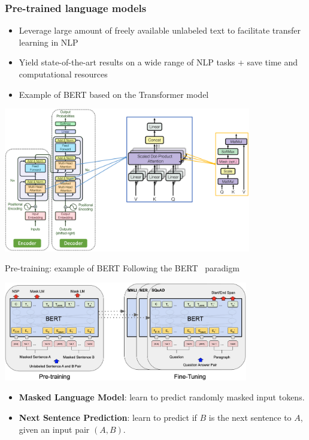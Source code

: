 \documentclass[table]{beamer}
\begin{document}
\begin{frame}
\frametitle{Pre-trained language models}
	\begin{itemize}
		\item Leverage large amount of freely available unlabeled text to facilitate transfer learning in NLP
		\item Yield state-of-the-art results on a wide range of NLP tasks + save time and computational resources
		\item Example of BERT \citep{bert} based on the Transformer model \citep{Vaswani2017}
	\end{itemize}
	
	\begin{center}
	\includegraphics[width=0.81\textwidth]{transformer_all}
	\end{center}


\end{frame}


\begin{frame}{Pre-training: example of BERT}{}	
Following the BERT~\cite{bert} paradigm
\begin{center}
	\includegraphics[width=0.8\textwidth]{bert_finetune}
\end{center}
	\begin{itemize}
		\item \textbf{Masked Language Model}: learn to predict randomly masked input tokens.
		\item \textbf{Next Sentence Prediction}: learn to predict if $B$ is the next sentence to $A$, given an input pair $(A,B)$. 
	\end{itemize}

\end{frame}
\end{document}
